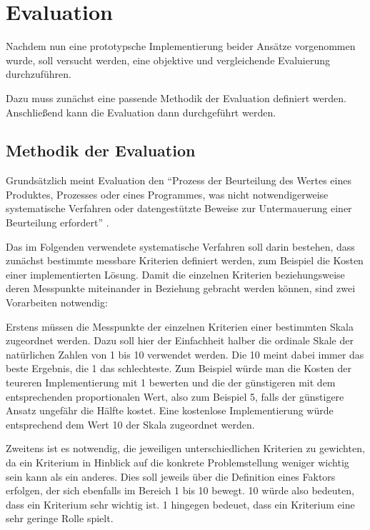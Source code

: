 \section{Evaluation}

Nachdem nun eine prototypsche Implementierung beider Ansätze vorgenommen wurde, soll versucht werden, eine objektive und vergleichende Evaluierung durchzuführen.

Dazu muss zunächst eine passende Methodik der Evaluation definiert werden. Anschließend kann die Evaluation dann durchgeführt werden.

\subsection{Methodik der Evaluation}

Grundsätzlich meint Evaluation den "`Prozess der Beurteilung des Wertes eines Produktes, Prozesses oder eines Programmes, was nicht notwendigerweise systematische Verfahren oder datengestützte Beweise zur Untermauerung einer Beurteilung erfordert"' \citep[S.][S. 9]{evaluationorig}.

Das im Folgenden verwendete systematische Verfahren soll darin bestehen, dass zunächst bestimmte messbare Kriterien definiert werden, zum Beispiel die Kosten einer implementierten Lösung. Damit die einzelnen Kriterien beziehungsweise deren Messpunkte miteinander in Beziehung gebracht werden können, sind zwei Vorarbeiten notwendig:

Erstens müssen die Messpunkte der einzelnen Kriterien einer bestimmten Skala zugeordnet werden. Dazu soll hier der Einfachheit halber die ordinale Skale der natürlichen Zahlen von 1 bis 10 verwendet werden. Die 10 meint dabei immer das beste Ergebnis, die 1 das schlechteste. Zum Beispiel würde man die Kosten der teureren Implementierung mit 1 bewerten und die der günstigeren mit dem entsprechenden proportionalen Wert, also zum Beispiel 5, falls der günstigere Ansatz ungefähr die Hälfte kostet. Eine kostenlose Implementierung würde entsprechend dem Wert 10 der Skala zugeordnet werden.

Zweitens ist es notwendig, die jeweiligen unterschiedlichen Kriterien zu gewichten, da ein Kriterium in Hinblick auf die konkrete Problemstellung weniger wichtig sein kann als ein anderes. Dies soll jeweils über die Definition eines Faktors erfolgen, der sich ebenfalls im Bereich 1 bis 10 bewegt. 10 würde also bedeuten, dass ein Kriterium sehr wichtig ist. 1 hingegen bedeuet, dass ein Kriterium eine sehr geringe Rolle spielt.

